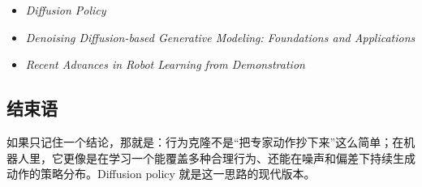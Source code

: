 \documentclass[a4paper]{article}
\begin{document}
\begin{itemize}
  \item \emph{Diffusion Policy}
  \item \emph{Denoising Diffusion-based Generative Modeling: Foundations and Applications}
  \item \emph{Recent Advances in Robot Learning from Demonstration}
\end{itemize}

\subsection{结束语}

如果只记住一个结论，那就是：行为克隆不是“把专家动作抄下来”这么简单；在机器人里，它更像是在学习一个能覆盖多种合理行为、还能在噪声和偏差下持续生成动作的策略分布。Diffusion policy 就是这一思路的现代版本。
\end{document}
